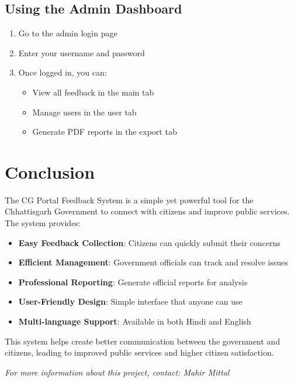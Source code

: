 \documentclass[12pt,a4paper]{article}
\begin{document}
\subsection{Using the Admin Dashboard}
\begin{enumerate}
    \item Go to the admin login page
    \item Enter your username and password
    \item Once logged in, you can:
    \begin{itemize}
        \item View all feedback in the main tab
        \item Manage users in the user tab
        \item Generate PDF reports in the export tab
    \end{itemize}
\end{enumerate}

\section{Conclusion}

The CG Portal Feedback System is a simple yet powerful tool for the Chhattisgarh Government to connect with citizens and improve public services. The system provides:

\begin{itemize}
    \item \textbf{Easy Feedback Collection}: Citizens can quickly submit their concerns
    \item \textbf{Efficient Management}: Government officials can track and resolve issues
    \item \textbf{Professional Reporting}: Generate official reports for analysis
    \item \textbf{User-Friendly Design}: Simple interface that anyone can use
    \item \textbf{Multi-language Support}: Available in both Hindi and English
\end{itemize}

This system helps create better communication between the government and citizens, leading to improved public services and higher citizen satisfaction.

\vspace{1cm}
\begin{center}
\textit{For more information about this project, contact: Mahir Mittal}
\end{center}
\end{document}
